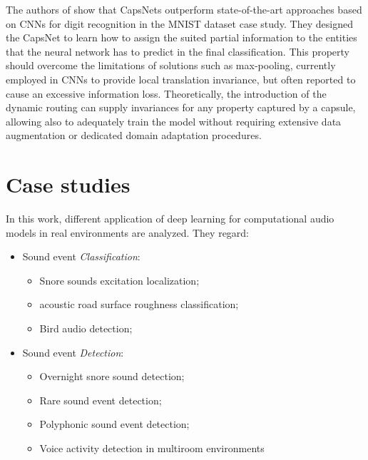 The authors of \cite{sabour2017dynamic} show that CapsNets outperform state-of-the-art approaches based on CNNs for digit recognition in the MNIST dataset case study.
They designed the CapsNet to learn how to assign the suited partial information to the entities that the neural network has to predict in the final classification. This property should overcome the limitations of solutions such as max-pooling, currently employed in CNNs to provide local translation invariance, but often reported to cause an excessive information loss. Theoretically, the introduction of the dynamic routing can supply invariances for any property captured by a capsule, allowing also to adequately train the model without requiring extensive data augmentation or dedicated domain adaptation procedures.


\section{Case studies}
In this work, different application of deep learning for computational audio models in real environments are analyzed. They regard:
\begin{itemize}
	\item Sound event \textit{Classification}:
	\begin{itemize}
		\item Snore sounds excitation localization;
		\item acoustic road surface roughness classification;
		\item Bird audio detection;
	\end{itemize}
	\item Sound event \textit{Detection}:
	\begin{itemize}
		\item Overnight snore sound detection;
		\item Rare sound event detection;
		\item Polyphonic sound event detection;
		\item Voice activity detection in multiroom environments
	\end{itemize}
\end{itemize}




